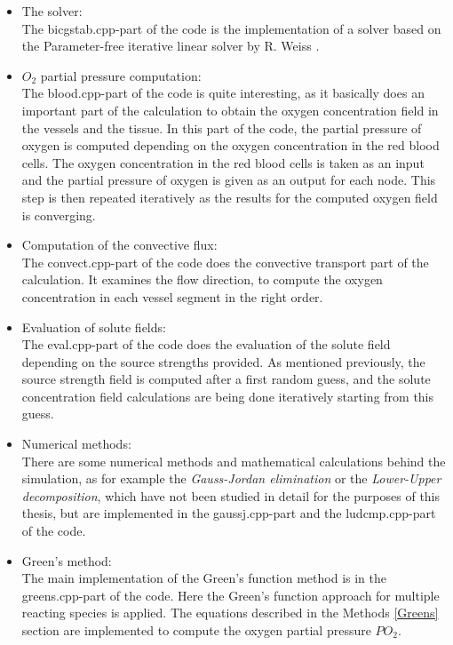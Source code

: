 \begin{itemize}
 \item The solver:
\\The bicgstab.cpp-part of the code is the implementation of a solver based on the Parameter-free iterative linear solver by R. Weiss \cite{weiss1996parameter}.
\\ \item $O_2$ partial pressure computation:
\\The blood.cpp-part of the code is quite interesting, as it basically does an important part of the calculation to obtain the oxygen concentration field in the vessels and the tissue. In this part of the code, the partial pressure of oxygen is computed depending on the oxygen concentration in the red blood cells. The oxygen concentration in the red blood cells is taken as an input and the partial pressure of oxygen is given as an output for each node. This step is then repeated iteratively as the results for the computed oxygen field is converging.
\\ \item Computation of the convective flux:
\\ The convect.cpp-part of the code does the convective transport part of the calculation. It examines the flow direction, to compute the oxygen concentration in each vessel segment in the right order.
\newpage
 \item Evaluation of solute fields:
\\The eval.cpp-part of the code does the evaluation of the solute field depending on the source strengths provided. As mentioned previously, the source strength field is computed after a first random guess, and the solute concentration field calculations are being done iteratively starting from this guess.
\\ \item Numerical methods:
\\There are some numerical methods and mathematical calculations behind the simulation, as for example the \emph{Gauss-Jordan elimination} or the \emph{Lower-Upper decomposition}, which have not been studied in detail for the purposes of this thesis, but are implemented in the gaussj.cpp-part and the ludcmp.cpp-part of the code.
\\ \item Green's method:
\\The main implementation of the Green's function method is in the greens.cpp-part of the code. Here the Green's function approach for multiple reacting species is applied. The equations described in the Methods \ref{Greens} section are implemented to compute the oxygen partial pressure $PO_2$.

\end{itemize}

